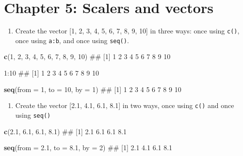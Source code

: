 \documentclass[]{book}
\newenvironment{Shaded}{\begin{snugshade}}{\end{snugshade}}
\newcommand{\KeywordTok}[1]{\textcolor[rgb]{0.13,0.29,0.53}{\textbf{{#1}}}}
\newcommand{\DataTypeTok}[1]{\textcolor[rgb]{0.13,0.29,0.53}{{#1}}}
\newcommand{\DecValTok}[1]{\textcolor[rgb]{0.00,0.00,0.81}{{#1}}}
\newcommand{\FloatTok}[1]{\textcolor[rgb]{0.00,0.00,0.81}{{#1}}}
\newcommand{\NormalTok}[1]{{#1}}
\providecommand{\tightlist}{%
  \setlength{\itemsep}{0pt}\setlength{\parskip}{0pt}}
\theoremstyle{definition}
\theoremstyle{definition}
\theoremstyle{remark}
\begin{document}
\section{Chapter 5: Scalers and
vectors}\label{chapter-5-scalers-and-vectors}

\begin{enumerate}
\def\labelenumi{\arabic{enumi}.}
\tightlist
\item
  Create the vector {[}1, 2, 3, 4, 5, 6, 7, 8, 9, 10{]} in three ways:
  once using \texttt{c()}, once using \texttt{a:b}, and once using
  \texttt{seq()}.
\end{enumerate}

\begin{Shaded}
\begin{Highlighting}[]
\KeywordTok{c}\NormalTok{(}\DecValTok{1}\NormalTok{, }\DecValTok{2}\NormalTok{, }\DecValTok{3}\NormalTok{, }\DecValTok{4}\NormalTok{, }\DecValTok{5}\NormalTok{, }\DecValTok{6}\NormalTok{, }\DecValTok{7}\NormalTok{, }\DecValTok{8}\NormalTok{, }\DecValTok{9}\NormalTok{, }\DecValTok{10}\NormalTok{)}
\NormalTok{##  [1]  1  2  3  4  5  6  7  8  9 10}

\DecValTok{1}\NormalTok{:}\DecValTok{10}
\NormalTok{##  [1]  1  2  3  4  5  6  7  8  9 10}

\KeywordTok{seq}\NormalTok{(}\DataTypeTok{from =} \DecValTok{1}\NormalTok{, }\DataTypeTok{to =} \DecValTok{10}\NormalTok{, }\DataTypeTok{by =} \DecValTok{1}\NormalTok{)}
\NormalTok{##  [1]  1  2  3  4  5  6  7  8  9 10}
\end{Highlighting}
\end{Shaded}

\begin{enumerate}
\def\labelenumi{\arabic{enumi}.}
\setcounter{enumi}{1}
\tightlist
\item
  Create the vector {[}2.1, 4.1, 6.1, 8.1{]} in two ways, once using
  \texttt{c()} and once using \texttt{seq()}
\end{enumerate}

\begin{Shaded}
\begin{Highlighting}[]

\KeywordTok{c}\NormalTok{(}\FloatTok{2.1}\NormalTok{, }\FloatTok{6.1}\NormalTok{, }\FloatTok{6.1}\NormalTok{, }\FloatTok{8.1}\NormalTok{)}
\NormalTok{## [1] 2.1 6.1 6.1 8.1}

\KeywordTok{seq}\NormalTok{(}\DataTypeTok{from =} \FloatTok{2.1}\NormalTok{, }\DataTypeTok{to =} \FloatTok{8.1}\NormalTok{, }\DataTypeTok{by =} \DecValTok{2}\NormalTok{)}
\NormalTok{## [1] 2.1 4.1 6.1 8.1}
\end{Highlighting}
\end{Shaded}
\end{document}
